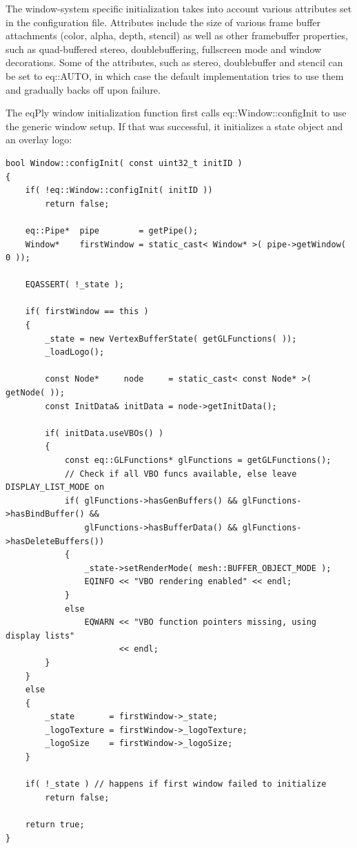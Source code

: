 \documentclass[10pt,a4]{scrartcl}
\begin{document}
The window-system specific initialization takes into account various
attributes set in the configuration file. Attributes include the size of
various frame buffer attachments (color, alpha, depth, stencil) as well
as other framebuffer properties, such as quad-buffered stereo,
doublebuffering, fullscreen mode and window decorations. Some of the
attributes, such as stereo, doublebuffer and stencil can be set to
\textsf{eq::AUTO}, in which case the default implementation tries to use
them and gradually backs off upon failure.

The \textsf{eqPly} window initialization function first calls
\textsf{eq::Window::configInit} to use the generic window setup. If that
was successful, it initializes a state object and an overlay logo:

{\footnotesize\begin{lstlisting}
bool Window::configInit( const uint32_t initID )
{
    if( !eq::Window::configInit( initID ))
        return false;

    eq::Pipe*  pipe        = getPipe();
    Window*    firstWindow = static_cast< Window* >( pipe->getWindow( 0 ));

    EQASSERT( !_state );

    if( firstWindow == this )
    {
        _state = new VertexBufferState( getGLFunctions( ));
        _loadLogo();

        const Node*     node     = static_cast< const Node* >( getNode( ));
        const InitData& initData = node->getInitData();

        if( initData.useVBOs() )
        {
            const eq::GLFunctions* glFunctions = getGLFunctions();
            // Check if all VBO funcs available, else leave DISPLAY_LIST_MODE on
            if( glFunctions->hasGenBuffers() && glFunctions->hasBindBuffer() &&
                glFunctions->hasBufferData() && glFunctions->hasDeleteBuffers())
            {
                _state->setRenderMode( mesh::BUFFER_OBJECT_MODE );
                EQINFO << "VBO rendering enabled" << endl;
            }
            else
                EQWARN << "VBO function pointers missing, using display lists" 
                       << endl;
        }
    }
    else
    {
        _state       = firstWindow->_state;
        _logoTexture = firstWindow->_logoTexture;
        _logoSize    = firstWindow->_logoSize;
    }

    if( !_state ) // happens if first window failed to initialize
        return false;
    
    return true;
}
\end{lstlisting}}%
\end{document}
